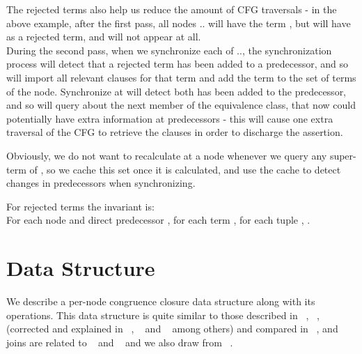 The rejected terms also help us reduce the amount of CFG traversals - in the above example, after the first pass, 
all nodes .. will have the term , but will have  as a rejected term, 
and  will not appear at all.\\
During the second pass, when we synchronize each of .., the synchronization process will detect that a rejected term  has been added to a predecessor, and so will import all relevant clauses for that term and add the term to the set of terms of the node.
Synchronize at  will detect both  has been added to the predecessor, and so will query about the next member of the equivalence class,  that now could potentially have extra information at predecessors - this will cause one extra traversal of the CFG to retrieve the clauses  in order to discharge the assertion.

Obviously, we do not want to recalculate  at a node  whenever we query any super-term of , so we cache this set once it is calculated, and use the cache to detect changes in predecessors when synchronizing.

For rejected terms the invariant is:\\
For each node  and direct predecessor , 
for each term , 
for each tuple , 
.


\newpage
\section{Data Structure}
We describe a per-node congruence closure data structure along with its operations.
This data structure is quite similar to those described in ~\cite{NelsonOppen80}, ~\cite{DowneySethiTarjan}, ~\cite{Shostak84} (corrected and explained in ~\cite{Cyrluk96onshostak}, ~\cite{Ganzinger02} and ~\cite{RuessS01} among others) and compared in ~\cite{AbstractCongruenceClosure}, and joins are related to ~\cite{JoinUIF} and ~\cite{Vagvolgyi03b} and we also draw from ~\cite{SuperpositionModuloShostak}.

